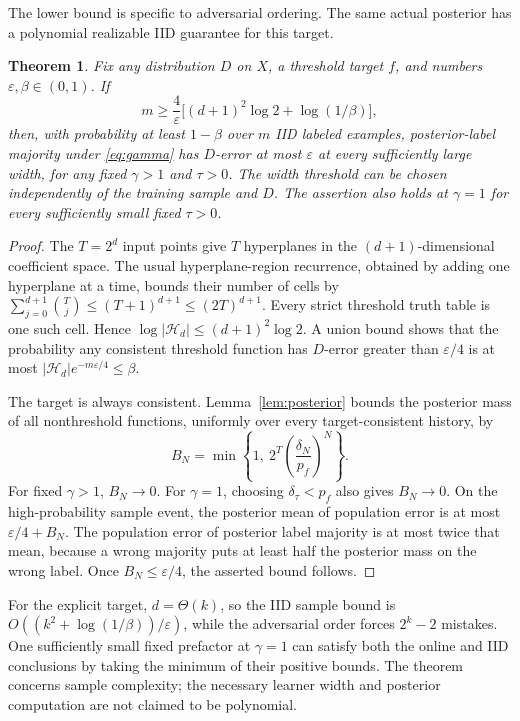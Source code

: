 \documentclass[11pt]{article}
\newtheorem{theorem}{Theorem}
\newcommand{\cH}{\mathcal H}
\begin{document}
The lower bound is specific to adversarial ordering. The same actual
posterior has a polynomial realizable IID guarantee for this target.

\begin{theorem}\label{thm:iid}
Fix any distribution $D$ on $X$, a threshold target $f$, and numbers
$\varepsilon,\beta\in(0,1)$. If
\begin{equation}\label{eq:samples}
 m\ge\frac4\varepsilon\bigl[(d+1)^2\log2+\log(1/\beta)\bigr],
\end{equation}
then, with probability at least $1-\beta$ over $m$ IID labeled examples,
posterior-label majority under \eqref{eq:gamma} has $D$-error at most
$\varepsilon$ at every sufficiently large width, for any fixed
$\gamma>1$ and $\tau>0$. The width threshold can be chosen independently
of the training sample and $D$. The assertion also holds at $\gamma=1$
for every sufficiently small fixed $\tau>0$.
\end{theorem}
\begin{proof}
The $T=2^d$ input points give $T$ hyperplanes in the $(d+1)$-dimensional
coefficient space. The usual hyperplane-region recurrence, obtained by
adding one hyperplane at a time, bounds their number of cells by
$\sum_{j=0}^{d+1}\binom Tj\le(T+1)^{d+1}\le(2T)^{d+1}$.
Every strict threshold truth table is one such cell. Hence
$\log|\cH_d|\le(d+1)^2\log2$.
A union bound shows that the probability any consistent threshold
function has $D$-error greater than $\varepsilon/4$ is at most
$|\cH_d|e^{-m\varepsilon/4}\le\beta$.

The target is always consistent. Lemma~\ref{lem:posterior} bounds the
posterior mass of all nonthreshold functions, uniformly over every
target-consistent history, by
\begin{equation}\label{eq:nonthreshold}
 B_N=\min\left\{1,\ 2^T\left(\frac{\delta_N}{p_f}\right)^N\right\}.
\end{equation}
For fixed $\gamma>1$, $B_N\to0$. For $\gamma=1$, choosing
$\delta_\tau<p_f$ also gives $B_N\to0$.
On the high-probability sample event, the posterior mean of population
error is at most $\varepsilon/4+B_N$. The population error of posterior
label majority is at most twice that mean, because a wrong majority
puts at least half the posterior mass on the wrong label. Once
$B_N\le\varepsilon/4$, the asserted bound follows.
\end{proof}

For the explicit target, $d=\Theta(k)$, so the IID sample bound is
$O((k^2+\log(1/\beta))/\varepsilon)$, while the adversarial order forces
$2^k-2$ mistakes. One sufficiently small fixed prefactor at $\gamma=1$
can satisfy both the online and IID conclusions by taking the minimum
of their positive bounds. The theorem concerns sample complexity;
the necessary learner width and posterior computation are not claimed
to be polynomial.
\end{document}
